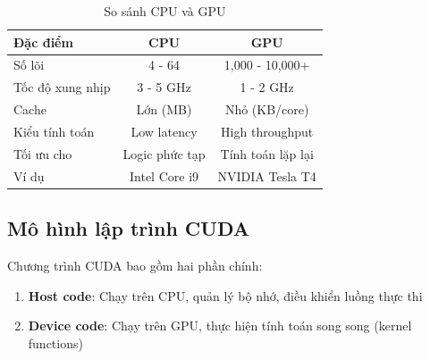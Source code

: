 \begin{table}[H]
\centering
\caption{So sánh CPU và GPU}
\label{tab:cpu_vs_gpu}
\begin{tabular}{@{}lcc@{}}
\toprule
\textbf{Đặc điểm} & \textbf{CPU} & \textbf{GPU} \\
\midrule
Số lõi & 4 - 64 & 1,000 - 10,000+ \\
Tốc độ xung nhịp & 3 - 5 GHz & 1 - 2 GHz \\
Cache & Lớn (MB) & Nhỏ (KB/core) \\
Kiểu tính toán & Low latency & High throughput \\
Tối ưu cho & Logic phức tạp & Tính toán lặp lại \\
Ví dụ & Intel Core i9 & NVIDIA Tesla T4 \\
\bottomrule
\end{tabular}
\end{table}

\subsection{Mô hình lập trình CUDA}

Chương trình CUDA bao gồm hai phần chính:
\begin{enumerate}
    \item \textbf{Host code}: Chạy trên CPU, quản lý bộ nhớ, điều khiển luồng thực thi
    \item \textbf{Device code}: Chạy trên GPU, thực hiện tính toán song song (kernel functions)
\end{enumerate}

